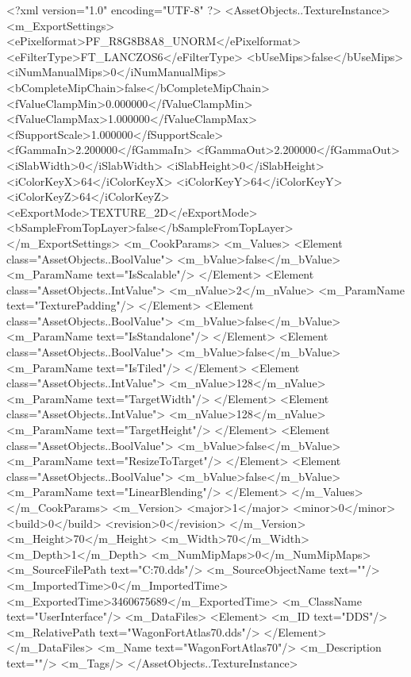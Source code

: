 <?xml version="1.0" encoding="UTF-8" ?>
<AssetObjects..TextureInstance>
	<m_ExportSettings>
		<ePixelformat>PF_R8G8B8A8_UNORM</ePixelformat>
		<eFilterType>FT_LANCZOS6</eFilterType>
		<bUseMips>false</bUseMips>
		<iNumManualMips>0</iNumManualMips>
		<bCompleteMipChain>false</bCompleteMipChain>
		<fValueClampMin>0.000000</fValueClampMin>
		<fValueClampMax>1.000000</fValueClampMax>
		<fSupportScale>1.000000</fSupportScale>
		<fGammaIn>2.200000</fGammaIn>
		<fGammaOut>2.200000</fGammaOut>
		<iSlabWidth>0</iSlabWidth>
		<iSlabHeight>0</iSlabHeight>
		<iColorKeyX>64</iColorKeyX>
		<iColorKeyY>64</iColorKeyY>
		<iColorKeyZ>64</iColorKeyZ>
		<eExportMode>TEXTURE_2D</eExportMode>
		<bSampleFromTopLayer>false</bSampleFromTopLayer>
	</m_ExportSettings>
	<m_CookParams>
		<m_Values>
			<Element class="AssetObjects..BoolValue">
				<m_bValue>false</m_bValue>
				<m_ParamName text="IsScalable"/>
			</Element>
			<Element class="AssetObjects..IntValue">
				<m_nValue>2</m_nValue>
				<m_ParamName text="TexturePadding"/>
			</Element>
			<Element class="AssetObjects..BoolValue">
				<m_bValue>false</m_bValue>
				<m_ParamName text="IsStandalone"/>
			</Element>
			<Element class="AssetObjects..BoolValue">
				<m_bValue>false</m_bValue>
				<m_ParamName text="IsTiled"/>
			</Element>
			<Element class="AssetObjects..IntValue">
				<m_nValue>128</m_nValue>
				<m_ParamName text="TargetWidth"/>
			</Element>
			<Element class="AssetObjects..IntValue">
				<m_nValue>128</m_nValue>
				<m_ParamName text="TargetHeight"/>
			</Element>
			<Element class="AssetObjects..BoolValue">
				<m_bValue>false</m_bValue>
				<m_ParamName text="ResizeToTarget"/>
			</Element>
			<Element class="AssetObjects..BoolValue">
				<m_bValue>false</m_bValue>
				<m_ParamName text="LinearBlending"/>
			</Element>
		</m_Values>
	</m_CookParams>
	<m_Version>
		<major>1</major>
		<minor>0</minor>
		<build>0</build>
		<revision>0</revision>
	</m_Version>
	<m_Height>70</m_Height>
	<m_Width>70</m_Width>
	<m_Depth>1</m_Depth>
	<m_NumMipMaps>0</m_NumMipMaps>
	<m_SourceFilePath text="C:\Users\aaron\Downloads\WagonFortAtlas70.dds"/>
	<m_SourceObjectName text=""/>
	<m_ImportedTime>0</m_ImportedTime>
	<m_ExportedTime>3460675689</m_ExportedTime>
	<m_ClassName text="UserInterface"/>
	<m_DataFiles>
		<Element>
			<m_ID text="DDS"/>
			<m_RelativePath text="WagonFortAtlas70.dds"/>
		</Element>
	</m_DataFiles>
	<m_Name text="WagonFortAtlas70"/>
	<m_Description text=""/>
	<m_Tags/>
</AssetObjects..TextureInstance>

